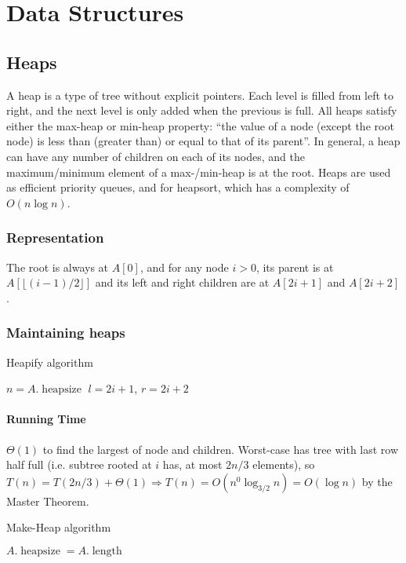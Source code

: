 \documentclass[10pt]{article}
\newcommand{\hs}{\mathop{heapsize}}
\begin{document}
\section{Data Structures}
\subsection{Heaps}
A heap is a type of tree without explicit pointers.  Each level is filled from left to right, and the next level is only added when the previous is full.  All heaps satisfy either the max-heap or min-heap property: ``the value of a node (except the root node) is less than (greater than) or equal to that of its parent''.  In general, a heap can have any number of children on each of its nodes, and the maximum/minimum element of a max-/min-heap is at the root.  Heaps are used as efficient priority queues, and for heapsort, which has a complexity of $O(n\log n)$.
\subsubsection{Representation}
The root is always at $A[0]$, and for any node $i>0$, its parent is at $A[\lfloor(i-1)/2\rfloor]$ and its left and right children are at $A[2i+1]$ and $A[2i+2]$.
\subsubsection{Maintaining heaps}
\begin{algorithm}
	\caption{Heapify algorithm}
	$n=A.\hs$\;
	$l=2i+1$, $r=2i+2$\;
\end{algorithm}
\paragraph{Running Time}$\Theta(1)$ to find the largest of node and children.  Worst-case has tree with last row half full (i.e. subtree rooted at $i$ has, at most $2n/3$ elements), so $T(n)=T(2n/3)+\Theta(1)\Rightarrow T(n)=O(n^0\log_{3/2}n)=O(\log n)$ by the Master Theorem.
\begin{algorithm}
	\caption{Make-Heap algorithm}
	$A.\hs=A.\mathop{length}$\;
\end{algorithm}
\end{document}
